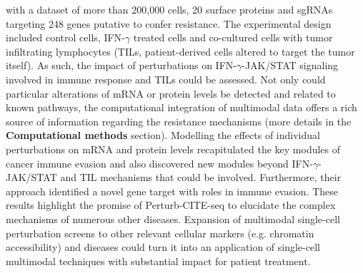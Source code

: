 \documentclass[times, twoside, watermark]{zHenriquesLab-StyleBioRxiv}
\begin{document}
with a dataset of more than 200,000 cells, 20 surface proteins and sgRNAs targeting 248 genes putative to confer resistance. The experimental design included control cells, IFN-$\gamma$ treated cells and co-cultured cells with tumor infiltrating lymphocytes (TILs, patient-derived cells altered to target the tumor itself). As such, the impact of perturbations on IFN-$\gamma$-JAK/STAT signaling involved in immune response and TILs could be assessed. Not only could particular alterations of mRNA or protein levels be detected and related to known pathways, the computational integration of multimodal data offers a rich source of information regarding the resistance mechanisms (more details in the \textbf{Computational methods} section). Modelling the effects of individual perturbations on mRNA and protein levels recapitulated the key modules of cancer immune evasion and also discovered new modules beyond IFN-$\gamma$-JAK/STAT and TIL mechanisms that could be involved. Furthermore, their approach identified a novel gene target with roles in immune evasion. These results highlight the promise of Perturb-CITE-seq to elucidate the complex mechanisms of numerous other diseases. Expansion of multimodal single-cell perturbation screens to other relevant cellular markers (e.g. chromatin accessibility) and diseases could turn it into an application of single-cell multimodal techniques with substantial impact for patient treatment.
\end{document}
